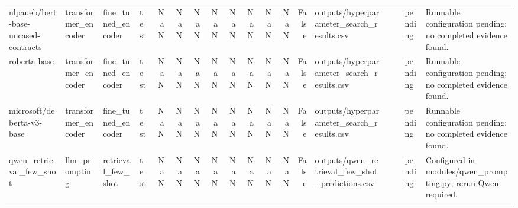\begin{tabular}{llllrrrrrrrrrlllll}
nlpaueb/bert-base-uncased-contracts & transformer\_encoder & fine\_tuned\_encoder & test & NaN & NaN & NaN & NaN & NaN & NaN & NaN & NaN & False & outputs/hyperparameter\_search\_results.csv &  &  & pending & Runnable configuration pending; no completed evidence found. \\
roberta-base & transformer\_encoder & fine\_tuned\_encoder & test & NaN & NaN & NaN & NaN & NaN & NaN & NaN & NaN & False & outputs/hyperparameter\_search\_results.csv &  &  & pending & Runnable configuration pending; no completed evidence found. \\
microsoft/deberta-v3-base & transformer\_encoder & fine\_tuned\_encoder & test & NaN & NaN & NaN & NaN & NaN & NaN & NaN & NaN & False & outputs/hyperparameter\_search\_results.csv &  &  & pending & Runnable configuration pending; no completed evidence found. \\
qwen\_retrieval\_few\_shot & llm\_prompting & retrieval\_few\_shot & test & NaN & NaN & NaN & NaN & NaN & NaN & NaN & NaN & False & outputs/qwen\_retrieval\_few\_shot\_predictions.csv &  &  & pending & Configured in modules/qwen\_prompting.py; rerun Qwen required. \\
\bottomrule
\end{tabular}
